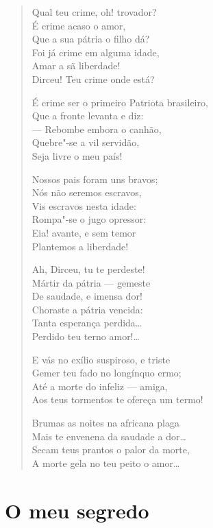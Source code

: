 \begin{verse}
Qual teu crime, oh! trovador?\\
É crime acaso o amor,\\
Que a sua pátria o filho dá?\\
Foi já crime em alguma idade,\\
Amar a sã liberdade!\\
Dirceu! Teu crime onde está?

É crime ser o primeiro Patriota brasileiro,\\
Que a fronte levanta e diz:\\
--- Rebombe embora o canhão,\\
Quebre"-se a vil servidão,\\
Seja livre o meu país!

Nossos pais foram uns bravos;\\
Nós não seremos escravos,\\
Vis escravos nesta idade:\\
Rompa"-se o jugo opressor:\\
Eia! avante, e sem temor\\
Plantemos a liberdade!

Ah, Dirceu, tu te perdeste!\\
Mártir da pátria --- gemeste\\
De saudade, e imensa dor!\\
Choraste a pátria vencida:\\
Tanta esperança perdida\ldots{}\\
Perdido teu terno amor!\ldots{}

E vás no exílio suspiroso, e triste\\
Gemer teu fado no longínquo ermo;\\
Até a morte do infeliz --- amiga,\\
Aos teus tormentos te ofereça um termo!

Brumas as noites na africana plaga\\
Mais te envenena da saudade a dor\ldots{}\\
Secam teus prantos o palor da morte,\\
A morte gela no teu peito o amor\ldots{}
\end{verse}

\chapter{O meu segredo}


